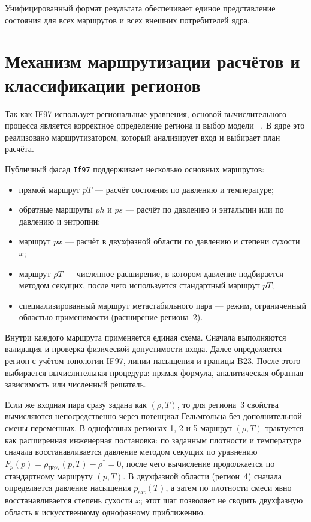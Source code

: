 Унифицированный формат результата
обеспечивает единое представление состояния
для всех маршрутов и всех внешних потребителей ядра.

\section{Механизм маршрутизации расчётов и классификации регионов}

Так как IF97 использует региональные уравнения,
основой вычислительного процесса является
корректное определение региона и выбор модели
~\cite{iapws_if97_2012}.
В ядре это реализовано маршрутизатором,
который анализирует вход и выбирает план расчёта.

Публичный фасад \texttt{If97} поддерживает несколько основных маршрутов:
\begin{itemize}
\item прямой маршрут $pT$ --- расчёт состояния по давлению и температуре;
\item обратные маршруты $ph$ и $ps$ --- расчёт по давлению и энтальпии или по давлению и энтропии;
\item маршрут $px$ --- расчёт в двухфазной области по давлению и степени сухости $x$;
\item маршрут $\rho T$ --- численное расширение, в котором давление подбирается методом секущих, после чего используется стандартный маршрут $pT$;
\item специализированный маршрут метастабильного пара --- режим, ограниченный областью применимости (расширение региона~2).
\end{itemize}

Внутри каждого маршрута применяется единая схема.
Сначала выполняются валидация и проверка физической допустимости входа.
Далее определяется регион с учётом топологии IF97,
линии насыщения и границы B23.
После этого выбирается вычислительная процедура:
прямая формула, аналитическая обратная зависимость
или численный решатель.

Если же входная пара сразу задана как $(\rho, T)$,
то для региона~3 свойства вычисляются непосредственно
через потенциал Гельмгольца без дополнительной смены переменных.
В однофазных регионах 1, 2 и 5
маршрут $(\rho, T)$ трактуется как расширенная инженерная постановка:
по заданным плотности и температуре сначала восстанавливается давление
методом секущих по уравнению $F_{p}(p)=\rho_{\mathrm{IF97}}(p,T)-\rho^{*}=0$,
после чего вычисление продолжается по стандартному маршруту $(p, T)$.
В двухфазной области (регион~4) сначала определяется давление насыщения
$p_{\mathrm{sat}}(T)$, а затем по плотности смеси явно восстанавливается
степень сухости $x$; этот шаг позволяет не сводить двухфазную область
к искусственному однофазному приближению.

